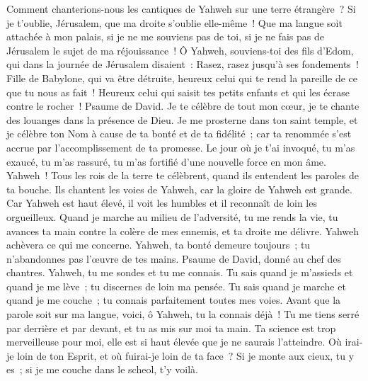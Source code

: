 \begin{multicols}{2}
Comment chanterions-nous les cantiques de Yahweh sur une terre étrangère~?
Si je t'oublie, Jérusalem, que ma droite s'oublie elle-même~!
Que ma langue soit attachée à mon palais, si je ne me souviens pas de toi, si je ne fais pas de Jérusalem le sujet de ma réjouissance~!
Ô Yahweh, souviens-toi des fils d'Edom, qui dans la journée de Jérusalem disaient~: Rasez, rasez jusqu'à ses fondements~!
Fille de Babylone, qui va être détruite, heureux celui qui te rend la pareille de ce que tu nous as fait~!
Heureux celui qui saisit tes petits enfants et qui les écrase contre le rocher~!
\VerseOne{}Psaume de David. Je te célèbre de tout mon cœur, je te chante des louanges dans la présence de Dieu.
Je me prosterne dans ton saint temple, et je célèbre ton Nom à cause de ta bonté et de ta fidélité~; car ta renommée s'est accrue par l'accomplissement de ta promesse.
Le jour où je t'ai invoqué, tu m'as exaucé, tu m'as rassuré, tu m'as fortifié d'une nouvelle force en mon âme.
Yahweh~! Tous les rois de la terre te célèbrent, quand ils entendent les paroles de ta bouche.
Ils chantent les voies de Yahweh, car la gloire de Yahweh est grande.
Car Yahweh est haut élevé, il voit les humbles et il reconnaît de loin les orgueilleux.
Quand je marche au milieu de l'adversité, tu me rends la vie, tu avances ta main contre la colère de mes ennemis, et ta droite me délivre.
Yahweh achèvera ce qui me concerne. Yahweh, ta bonté demeure toujours~; tu n'abandonnes pas l'œuvre de tes mains.
\VerseOne{}Psaume de David, donné au chef des chantres. Yahweh, tu me sondes et tu me connais.
Tu sais quand je m'assieds et quand je me lève~; tu discernes de loin ma pensée.
Tu sais quand je marche et quand je me couche~; tu connais parfaitement toutes mes voies.
Avant que la parole soit sur ma langue, voici, ô Yahweh, tu la connais déjà~!
Tu me tiens serré par derrière et par devant, et tu as mis sur moi ta main. 
Ta science est trop merveilleuse pour moi, elle est si haut élevée que je ne saurais l'atteindre.
Où irai-je loin de ton Esprit, et où fuirai-je loin de ta face~?
Si je monte aux cieux, tu y es~; si je me couche dans le scheol, t'y voilà.

\end{multicols}
